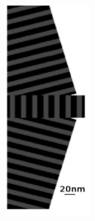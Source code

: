 \documentclass{beamer}
\begin{document}
\begin{frame}
\begin{columns}
\begin{column}{0.5\textwidth}
\begin{figure}
				\includegraphics[angle=90,width=\textwidth]{../images/multilayer/konc_eps_mgr.png}\\

\end{figure}
\end{column}
\end{columns}
\end{frame}
\end{document}
